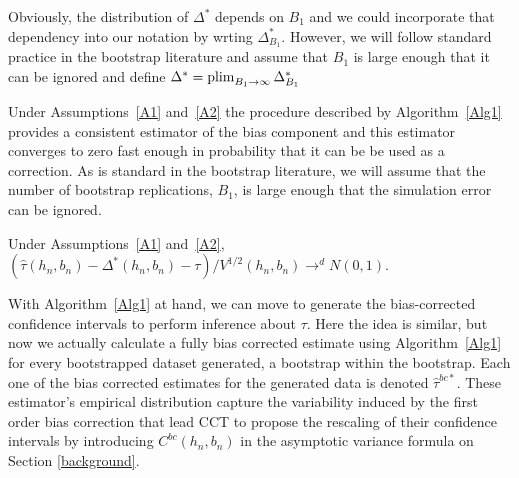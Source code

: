 \documentclass[12pt,fleqn]{article}
\begin{document}
Obviously, the distribution of $\Delta^*$ depends on $B_1$ and we could
incorporate that dependency into our notation by wrting
$\Delta^*_{B_1}$. However, we will follow standard practice in the bootstrap
literature and assume that $B_1$ is large enough that it can be ignored and
define $\Delta^* = \operatorname*{plim}_{B_1 \to \infty} \Delta^*_{B_1}$

Under Assumptions~\ref{A1} and~\ref{A2} the procedure described by
Algorithm~\ref{Alg1} provides a consistent estimator of the bias component and
this estimator converges to zero fast enough in probability that it can be be
used as a correction. As is standard in the bootstrap literature, we will assume
that the number of bootstrap replications, $B_1$, is large enough that the
simulation error can be ignored.

\begin{theorem}\label{T1}
  Under Assumptions~\ref{A1} and~\ref{A2},
  $(\hat\tau(h_n,b_n) - \Delta^*(h_n,b_n) - \tau) / V^{1/2}(h_n, b_n) \to^d N(0,1)$.
\end{theorem}

With Algorithm~\ref{Alg1} at hand, we can move to generate the bias-corrected confidence intervals to perform inference about $\tau$. Here the idea is similar, but now we actually calculate a fully bias corrected estimate using Algorithm~\ref{Alg1} for every bootstrapped dataset generated, a bootstrap within the bootstrap. Each one of the bias corrected estimates for the generated data is denoted $\hat{\tau}^{bc*}$. These estimator's empirical distribution capture the variability induced by the first order bias correction that lead CCT to propose the rescaling of their confidence intervals by introducing $C^{bc}(h_{n},b_{n})$ in the asymptotic variance formula on Section \ref{background}.
\end{document}
